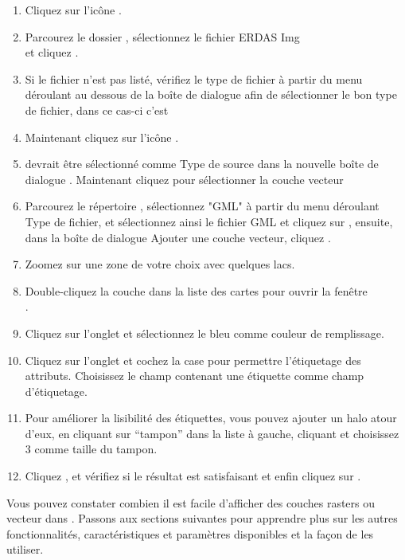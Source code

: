 {\setlength{\baselineskip}{1.3\baselineskip}
\begin{enumerate}[itemsep=2pt]
\item Cliquez sur l'icône .
\item Parcourez le dossier , sélectionnez 
le fichier ERDAS Img\\
  et cliquez .
\item Si le fichier n'est pas listé, vérifiez le type de fichier à partir du menu déroulant 
au dessous de la boîte de dialogue afin de sélectionner le bon type de fichier, dans ce cas-ci c'est 
\item Maintenant cliquez sur l'icône . 
\item {} devrait être sélectionné comme Type de source dans la nouvelle boîte de dialogue 
. Maintenant cliquez  pour sélectionner la couche vecteur
\item Parcourez le répertoire , sélectionnez "GML"
à partir du menu déroulant Type de fichier, et sélectionnez ainsi le fichier GML  
et cliquez sur , ensuite, dans la boîte de dialogue Ajouter une couche vecteur, cliquez .
\item Zoomez sur une zone de votre choix avec quelques lacs.
\item Double-cliquez la couche  dans la liste des cartes pour ouvrir la fenêtre\\ .
\item Cliquez sur l'onglet  et sélectionnez le bleu comme couleur de remplissage.
\item Cliquez sur l'onglet  et cochez la case  pour permettre l'étiquetage des attributs. 
Choisissez le champ contenant une étiquette comme champ d'étiquetage.
\item Pour améliorer la lisibilité des étiquettes, vous pouvez ajouter un halo atour d'eux,
en cliquant sur ``tampon'' dans la liste à gauche, cliquant  et choisissez 3 comme taille du tampon.
\item Cliquez , et vérifiez si le résultat est satisfaisant et enfin cliquez sur .
\end{enumerate} 
\par}
Vous pouvez constater combien il est facile d'afficher des couches rasters ou vecteur dans \qg. Passons aux sections suivantes pour apprendre plus sur les autres fonctionnalités, caractéristiques et paramètres disponibles et la façon de les utiliser.
